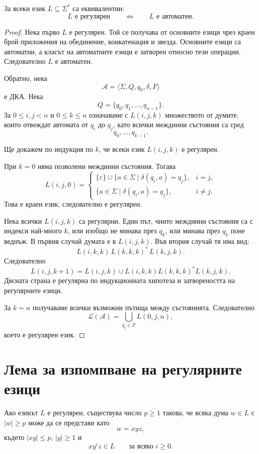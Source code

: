 \begin{thm}[Клини]
За всеки език $L\subseteq\Sigma^*$ са еквивалентни:
\[
L\text{ е регулярен}
\qquad\Longleftrightarrow\qquad
L\text{ е автоматен}.
\]
\end{thm}

\begin{proof}
Нека първо $L$ е регулярен. Той се получава от основните езици чрез краен брой приложения на обединение, конкатенация и звезда. Основните езици са автоматни, а класът на автоматните езици е затворен относно тези операции. Следователно $L$ е автоматен.

Обратно, нека
\[
\mathcal A=\langle\Sigma,Q,q_0,\delta,F\rangle
\]
е ДКА. Нека
\[
Q=\{q_0,q_1,\ldots,q_{n-1}\}.
\]
За $0\leq i,j<n$ и $0\leq k\leq n$ означаваме с $L(i,j,k)$ множеството от думите, които отвеждат автомата от $q_i$ до $q_j$, като всички междинни състояния са сред
\[
q_0,\ldots,q_{k-1}.
\]

Ще докажем по индукция по $k$, че всеки език $L(i,j,k)$ е регулярен.

При $k=0$ няма позволени междинни състояния. Тогава
\[
L(i,j,0)=
\begin{cases}
\{\varepsilon\}\cup\{a\in\Sigma\mid\delta(q_i,a)=q_j\},&i=j,\\
\{a\in\Sigma\mid\delta(q_i,a)=q_j\},&i\ne j.
\end{cases}
\]
Това е краен език, следователно е регулярен.

Нека всички $L(i,j,k)$ са регулярни. Един път, чиито междинни състояния са с индекси най-много $k$, или изобщо не минава през $q_k$, или минава през $q_k$ поне веднъж. В първия случай думата е в $L(i,j,k)$. Във втория случай тя има вид:
\[
L(i,k,k)\,L(k,k,k)^*\,L(k,j,k).
\]
Следователно
\[
L(i,j,k+1)=
L(i,j,k)\cup
L(i,k,k)L(k,k,k)^*L(k,j,k).
\]
Дясната страна е регулярна по индукционната хипотеза и затвореността на регулярните езици.

За $k=n$ получаваме всички възможни пътища между състоянията. Следователно
\[
\mathcal L(\mathcal A)
=
\bigcup_{q_j\in F}L(0,j,n),
\]
което е регулярен език.
\end{proof}

\section{Лема за изпомпване на регулярните езици}\label{s:4.4}

\begin{keythm}
Ако езикът $L$ е регулярен, съществува число $p\geq 1$ такова, че всяка дума $w\in L$ с $|w|\geq p$ може да се представи като
\[
w=xyz,
\]
където $|xy|\leq p$, $|y|\geq1$ и
\[
xy^iz\in L
\qquad\text{за всяко }i\geq0.
\]
\end{keythm}

